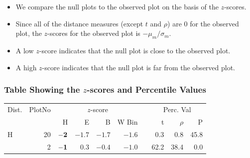\documentclass{beamer}
\begin{document}
\begin{frame}
\begin{itemize}
\item We compare the null plots to the observed plot on the basis of the $z$-scores.
\item Since all of the distance measures (except $t$ and $\rho$) are 0 for the observed plot, the $z$-scores for the observed plot is $- \mu_m/ \sigma_m$.
\item A low $z$-score indicates that the null plot is close to the observed plot.
\item A high $z$-score indicates that the null plot is far from the observed plot.
\end{itemize}
\end{frame}

\begin{frame}
\frametitle{Table Showing the $z$-scores and Percentile Values}
\begin{table}[hbt]
	\vspace{-.4in}
%
\centering  %
\begin{tabular}{l r rrrr r rrr}  %
\hline                       %
Dist. & PlotNo &\multicolumn{4}{c}{$z$-score} & &\multicolumn{3}{c}{Perc. Val} \\ [0.5ex]   
 \cline{1-1}\cline{3-6}\cline{8-10}
 & & H & E & B & W Bin & & t & $\rho$ & P   \\     [0.5ex]
\hline
H  & 20 & $\bf -2$ & $-1.7$ & $-1.7$ & $-1.6$ & & 0.3 & 0.8 & 45.8 \\[-0.5ex]
 & 2 & $\bf -1$ & 0.3 & $-0.4$ & $-1.0$ & & 62.2 & 38.4 & 0.0\\[-0.5ex]


\end{tabular}
\end{table}
\end{frame}
\end{document}
